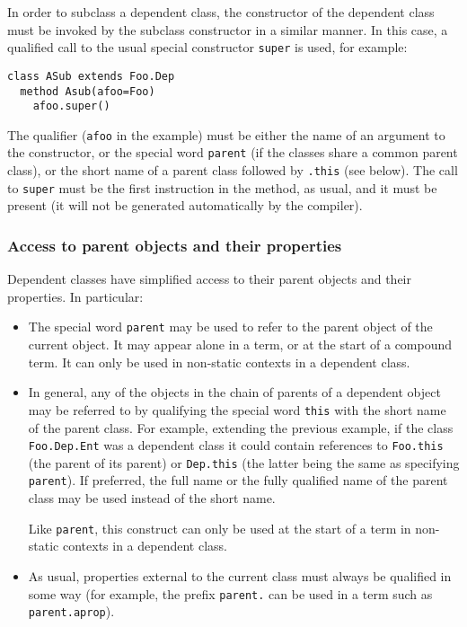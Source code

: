 In order to subclass a dependent class, the constructor of the dependent
class must be invoked by the subclass constructor in a similar manner.
In this case, a qualified call to the usual special
constructor \texttt{super} is used, for example:
\begin{lstlisting}
class ASub extends Foo.Dep
  method Asub(afoo=Foo)
    afoo.super()
\end{lstlisting}
 The qualifier (\texttt{afoo} in the example) must be either the name of
an argument to the constructor, or the special word \texttt{parent} (if
the classes share a common parent class), or the short name of a parent
class followed by \texttt{.this} (see below).
The call to \texttt{super} must be the first instruction in the method, as
usual, and it must be present (it will not be generated automatically by
the compiler).
\subsubsection{Access to parent objects and their properties}
 
Dependent classes have simplified access to their parent objects and
their properties.
In particular:
\begin{itemize}
\item The special word \texttt{parent} may be used to refer to the
parent object of the current object.  It may appear alone in a term, or
at the start of a compound term.
It can only be used in non-static contexts in a dependent class.
\item 
{}
In general, any of the objects in the chain of parents of a dependent
object may be referred to by qualifying the special word \texttt{this}
with the short name of the parent class.
For example, extending the previous example, if the
class \texttt{Foo.Dep.Ent} was a dependent class it could contain
references to \texttt{Foo.this} (the parent of its parent)
or \texttt{Dep.this} (the latter being the same as
specifying \texttt{parent}).  If preferred, the full name or the fully
qualified name of the parent class may be used instead of the short
name.
 
Like \texttt{parent}, this construct can only be used at the start of a
term in non-static contexts in a dependent class.
\item 
{}
As usual, properties external to the current class must always be
qualified in some way (for example, the prefix \texttt{parent.} can be
used in a term such as \texttt{parent.aprop}).
\end{itemize}
